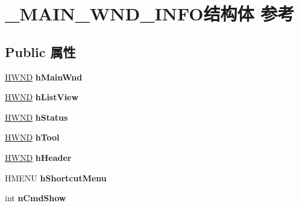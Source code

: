 \hypertarget{struct___m_a_i_n___w_n_d___i_n_f_o}{}\section{\+\_\+\+M\+A\+I\+N\+\_\+\+W\+N\+D\+\_\+\+I\+N\+F\+O结构体 参考}
\label{struct___m_a_i_n___w_n_d___i_n_f_o}
\subsection*{Public 属性}
\begin{DoxyCompactItemize}
\item 
\mbox{\label{struct___m_a_i_n___w_n_d___i_n_f_o_a56e9cf18d9db2154a95a82617925cab0}} 
\hyperlink{interfacevoid}{H\+W\+ND} {\bfseries h\+Main\+Wnd}
\item 
\mbox{\label{struct___m_a_i_n___w_n_d___i_n_f_o_a9b80de127e224b801a183efb3c6cea1f}} 
\hyperlink{interfacevoid}{H\+W\+ND} {\bfseries h\+List\+View}
\item 
\mbox{\label{struct___m_a_i_n___w_n_d___i_n_f_o_a3d74bdd70af5c5276527fdfcd172dfb1}} 
\hyperlink{interfacevoid}{H\+W\+ND} {\bfseries h\+Status}
\item 
\mbox{\label{struct___m_a_i_n___w_n_d___i_n_f_o_a0463f1fadbf95f66eeae6f469a7920d4}} 
\hyperlink{interfacevoid}{H\+W\+ND} {\bfseries h\+Tool}
\item 
\mbox{\label{struct___m_a_i_n___w_n_d___i_n_f_o_a3fa58379f902e006af57af57e5a24537}} 
\hyperlink{interfacevoid}{H\+W\+ND} {\bfseries h\+Header}
\item 
\mbox{\label{struct___m_a_i_n___w_n_d___i_n_f_o_a3c97bb4f1deebc5526e3ed74a912fb05}} 
H\+M\+E\+NU {\bfseries h\+Shortcut\+Menu}
\item 
\mbox{\label{struct___m_a_i_n___w_n_d___i_n_f_o_afefdbc2d8511ec08bef30b7badd187b1}} 
int {\bfseries n\+Cmd\+Show}
\item 
\mbox{\label{struct___m_a_i_n___w_n_d___i_n_f_o_a9e43fc3a7b1246b7319e3b5c964f4f11}} 

\end{DoxyCompactItemize}

